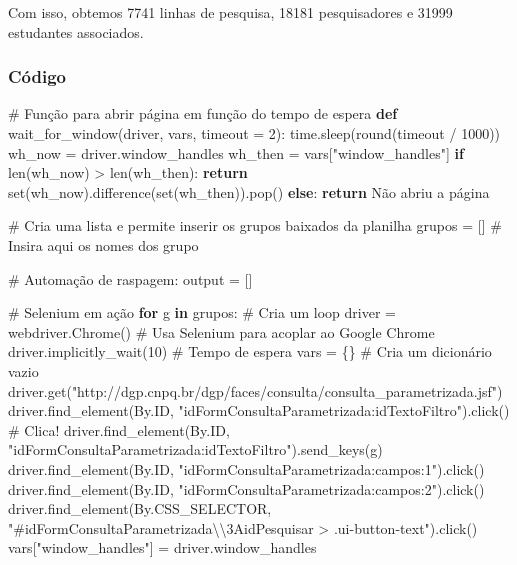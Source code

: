 \documentclass[
  brazilian,
  letterpaper,
  DIV=11,
  numbers=noendperiod]{scrartcl}
\newenvironment{Shaded}{\begin{snugshade}}{\end{snugshade}}
\newcommand{\BuiltInTok}[1]{\textcolor[rgb]{0.00,0.23,0.31}{#1}}
\newcommand{\CharTok}[1]{\textcolor[rgb]{0.13,0.47,0.30}{#1}}
\newcommand{\CommentTok}[1]{\textcolor[rgb]{0.37,0.37,0.37}{#1}}
\newcommand{\ControlFlowTok}[1]{\textcolor[rgb]{0.00,0.23,0.31}{\textbf{#1}}}
\newcommand{\DecValTok}[1]{\textcolor[rgb]{0.68,0.00,0.00}{#1}}
\newcommand{\KeywordTok}[1]{\textcolor[rgb]{0.00,0.23,0.31}{\textbf{#1}}}
\newcommand{\NormalTok}[1]{\textcolor[rgb]{0.00,0.23,0.31}{#1}}
\newcommand{\OperatorTok}[1]{\textcolor[rgb]{0.37,0.37,0.37}{#1}}
\newcommand{\StringTok}[1]{\textcolor[rgb]{0.13,0.47,0.30}{#1}}
\begin{document}
Com isso, obtemos 7741 linhas de pesquisa, 18181 pesquisadores e 31999
estudantes associados.

\subsubsection{Código}

\begin{Shaded}
\begin{Highlighting}[numbers=left,,]
\CommentTok{\# Função para abrir página em função do tempo de espera}
\KeywordTok{def}\NormalTok{ wait\_for\_window(driver, }\BuiltInTok{vars}\NormalTok{, timeout }\OperatorTok{=} \DecValTok{2}\NormalTok{):}
\NormalTok{    time.sleep(}\BuiltInTok{round}\NormalTok{(timeout }\OperatorTok{/} \DecValTok{1000}\NormalTok{))}
\NormalTok{    wh\_now }\OperatorTok{=}\NormalTok{ driver.window\_handles}
\NormalTok{    wh\_then }\OperatorTok{=} \BuiltInTok{vars}\NormalTok{[}\StringTok{"window\_handles"}\NormalTok{]}
    \ControlFlowTok{if} \BuiltInTok{len}\NormalTok{(wh\_now) }\OperatorTok{\textgreater{}} \BuiltInTok{len}\NormalTok{(wh\_then):}
        \ControlFlowTok{return} \BuiltInTok{set}\NormalTok{(wh\_now).difference(}\BuiltInTok{set}\NormalTok{(wh\_then)).pop()}
    \ControlFlowTok{else}\NormalTok{:}
        \ControlFlowTok{return} \StringTok{\textquotesingle{}Não abriu a página\textquotesingle{}}
    
\CommentTok{\# Cria uma lista e permite inserir os grupos baixados da planilha}
\NormalTok{grupos }\OperatorTok{=}\NormalTok{ [] }\CommentTok{\# Insira aqui os nomes dos grupo}

\CommentTok{\# Automação de raspagem:}
\NormalTok{output }\OperatorTok{=}\NormalTok{ []   }

\CommentTok{\# Selenium em ação}
\ControlFlowTok{for}\NormalTok{ g }\KeywordTok{in}\NormalTok{ grupos:                }\CommentTok{\# Cria um loop}
\NormalTok{    driver }\OperatorTok{=}\NormalTok{ webdriver.Chrome() }\CommentTok{\# Usa Selenium para acoplar ao Google Chrome}
\NormalTok{    driver.implicitly\_wait(}\DecValTok{10}\NormalTok{)  }\CommentTok{\# Tempo de espera}
    \BuiltInTok{vars} \OperatorTok{=}\NormalTok{ \{\}                   }\CommentTok{\# Cria um dicionário vazio}
\NormalTok{    driver.get(}\StringTok{"http://dgp.cnpq.br/dgp/faces/consulta/consulta\_parametrizada.jsf"}\NormalTok{)}
\NormalTok{    driver.find\_element(By.ID, }\StringTok{"idFormConsultaParametrizada:idTextoFiltro"}\NormalTok{).click() }\CommentTok{\# Clica!}
\NormalTok{    driver.find\_element(By.ID, }\StringTok{"idFormConsultaParametrizada:idTextoFiltro"}\NormalTok{).send\_keys(g)}
\NormalTok{    driver.find\_element(By.ID, }\StringTok{"idFormConsultaParametrizada:campos:1"}\NormalTok{).click()}
\NormalTok{    driver.find\_element(By.ID, }\StringTok{"idFormConsultaParametrizada:campos:2"}\NormalTok{).click()}
\NormalTok{    driver.find\_element(By.CSS\_SELECTOR, }\StringTok{"\#idFormConsultaParametrizada}\CharTok{\textbackslash{}\textbackslash{}}\StringTok{3AidPesquisar \textgreater{} .ui{-}button{-}text"}\NormalTok{).click()}
    \BuiltInTok{vars}\NormalTok{[}\StringTok{"window\_handles"}\NormalTok{] }\OperatorTok{=}\NormalTok{ driver.window\_handles}


\end{Highlighting}
\end{Shaded}
\end{document}
